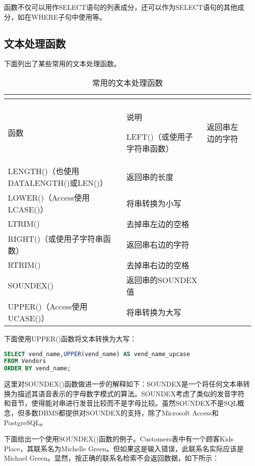 函数不仅可以用作SELECT语句的列表成分，还可以作为SELECT语句的其他成分，如在WHERE子句中使用等。

\subsection{文本处理函数}


下面列出了某些常用的文本处理函数。

\begin{longtable}{|m{250pt}|m{140pt}|}
\hline
{}
\tabularnewline\hline
\endhead

\caption{常用的文本处理函数}\\
\hline
函数	&说明
\endfirsthead

\endfoot

\endlastfoot
\hline
LEFT()（或使用子字符串函数）&返回串左边的字符\\
\hline
LENGTH()（也使用DATALENGTH()或LEN()）&返回串的长度\\
\hline
LOWER()（Access使用LCASE()）&将串转换为小写\\
\hline
LTRIM()&去掉串左边的空格\\
\hline
RIGHT()（或使用子字符串函数）&返回串右边的字符\\
\hline
RTRIM()&去掉串右边的空格\\
\hline
SOUNDEX()&返回串的SOUNDEX值\\
\hline
UPPER()（Access使用UCASE()）&将串转换为大写\\
\hline
\end{longtable}

下面使用UPPER()函数将文本转换为大写：

\begin{lstlisting}[language=SQL]
SELECT vend_name,UPPER(vend_name) AS vend_name_upcase
FROM Vendors
ORDER BY vend_name;
\end{lstlisting}

这里对SOUNDEX()函数做进一步的解释如下：SOUNDEX是一个将任何文本串转换为描述其语音表示的字母数字模式的算法。SOUNDEX考虑了类似的发音字符和音节，使得能对串进行发音比较而不是字母比较。虽然SOUNDEX不是SQL概念，但多数DBMS都提供对SOUNDEX的支持，除了Microsoft Access和PostgreSQL。

下面给出一个使用SOUNDEX()函数的例子。Customers表中有一个顾客Kids Place，其联系名为Michelle Green。但如果这是输入错误，此联系名实际应该是Michael Green。显然，按正确的联系名检索不会返回数据，如下所示：


